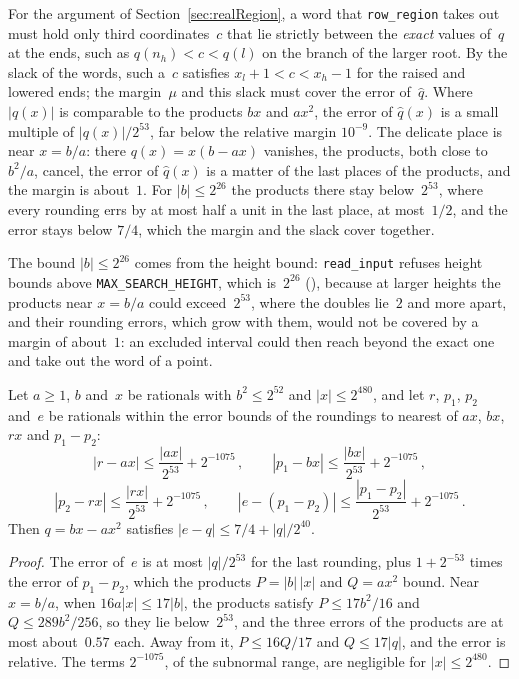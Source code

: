 For the argument of Section~\ref{sec:realRegion}, a word that \texttt{row\_region} takes out must
hold only third coordinates~$c$ that lie strictly between the \emph{exact} values of~$q$ at the
ends, such as $q(n_h) < c < q(l)$ on the branch of the larger root. By the slack of the words, such
a~$c$ satisfies $x_l + 1 < c < x_h - 1$ for the raised and lowered ends; the margin~$\mu$ and this
slack must cover the error of~$\widehat{q}$. Where $|q(x)|$ is comparable to the products $bx$
and $ax^2$, the error of $\widehat{q}(x)$ is a small multiple of $|q(x)|/2^{53}$, far below the
relative margin $10^{-9}$. The delicate place is near $x = b/a$: there $q(x) = x(b - ax)$ vanishes,
the products, both close to $b^2/a$, cancel, the error of $\widehat{q}(x)$ is a matter of the last
places of the products, and the margin is about~$1$. For $|b| \le 2^{26}$ the products there stay
below~$2^{53}$, where every rounding errs by at most half a unit in the last place, at
most~$1/2$, and the error stays below $7/4$, which the margin and the slack cover together.

The bound $|b| \le 2^{26}$ comes from the height bound: \texttt{read\_input} refuses height bounds
above \texttt{MAX\_SEARCH\_HEIGHT}, which is~$2^{26}$ (), because at
larger heights the products near $x = b/a$ could exceed~$2^{53}$, where the doubles lie~$2$ and more
apart, and their rounding errors, which grow with them, would not be covered by a margin of
about~$1$: an excluded interval could then reach beyond the exact one and take out the word of a
point.

\begin{lemma}\label{lem:abs_sub_le_of_roundings}
  \leanok
  Let $a \ge 1$, $b$ and~$x$ be rationals with $b^2 \le 2^{52}$ and $|x| \le 2^{480}$, and let
  $r$, $p_1$, $p_2$ and~$e$ be rationals within the error bounds of the roundings to nearest of $ax$,
  $bx$, $rx$ and $p_1 - p_2$:
  \[ |r - ax| \le \frac{|ax|}{2^{53}} + 2^{-1075}\,, \qquad
     |p_1 - bx| \le \frac{|bx|}{2^{53}} + 2^{-1075}\,, \]
  \[ |p_2 - rx| \le \frac{|rx|}{2^{53}} + 2^{-1075}\,, \qquad
     |e - (p_1 - p_2)| \le \frac{|p_1 - p_2|}{2^{53}} + 2^{-1075}\,. \]
  Then $q = bx - ax^2$ satisfies $|e - q| \le 7/4 + |q|/2^{40}$.
\end{lemma}

\begin{proof}
  \leanok
  The error of~$e$ is at most $|q|/2^{53}$ for the last rounding, plus $1 + 2^{-53}$ times the
  error of $p_1 - p_2$, which the products $P = |b|\,|x|$ and $Q = ax^2$ bound. Near $x = b/a$,
  when $16 a |x| \le 17 |b|$, the products satisfy $P \le 17 b^2/16$ and $Q \le 289 b^2/256$, so
  they lie below~$2^{53}$, and the three errors of the products are at most about~$0.57$ each.
  Away from it, $P \le 16 Q/17$ and $Q \le 17 |q|$, and the error is relative. The terms
  $2^{-1075}$, of the subnormal range, are negligible for $|x| \le 2^{480}$.
\end{proof}

